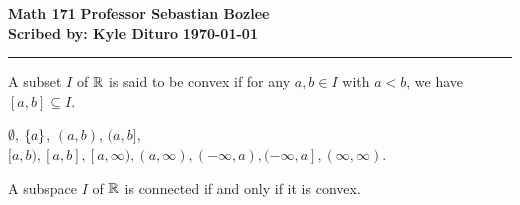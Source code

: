 \documentclass[12pt, twosided]{article}
\begin{document}
\noindent \textbf{Math 171} \hfill \textbf{Professor Sebastian Bozlee} \\
\textbf{Scribed by: Kyle Dituro} \hfill \textbf{\today}\hrule
\vspace{.2in}

\begin{df}
  A subset \(I\) of \(\mathbb{R}\) is said to be convex if for any \(a, b \in I\) with \(a < b\), we have \([a,b] \subseteq I\).
\end{df}
\begin{exa}
  \(\emptyset\), \(\left\{ a \right\}\), \((a,b)\), \((a, b]\), \([a,b), [a,b], [a, \infty), (a, \infty), (-\infty, a), (-\infty, a], (\infty, \infty)\).
\end{exa}

\begin{thm}
  A subspace \(I\) of \(\mathbb{R}\) is connected if and only if it is convex.
\end{thm}
\end{document}
